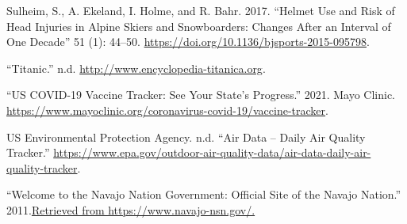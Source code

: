 \documentclass[
]{report}
\newlength{\cslhangindent}
\newlength{\cslentryspacingunit} %
\newenvironment{CSLReferences}[2] %
 {%
  \setlength{\parindent}{0pt}
  \ifodd #1
  \let\oldpar\par
  \def\par{\hangindent=\cslhangindent\oldpar}
  \fi
  \setlength{\parskip}{#2\cslentryspacingunit}
 }%
 {}
\begin{document}
\begin{CSLReferences}{1}{0}
\leavevmode{}%
Sulheim, S., A. Ekeland, I. Holme, and R. Bahr. 2017. {``Helmet Use and Risk of Head Injuries in Alpine Skiers and Snowboarders: Changes After an Interval of One Decade''} 51 (1): 44--50. \url{https://doi.org/10.1136/bjsports-2015-095798}.

\leavevmode{}%
{``Titanic.''} n.d. \url{http://www.encyclopedia-titanica.org}.

\leavevmode{}%
{``US COVID-19 Vaccine Tracker: See Your State's Progress.''} 2021. Mayo Clinic. \url{https://www.mayoclinic.org/coronavirus-covid-19/vaccine-tracker}.

\leavevmode{}%
US Environmental Protection Agency. n.d. {``Air Data -- Daily Air Quality Tracker.''} \url{https://www.epa.gov/outdoor-air-quality-data/air-data-daily-air-quality-tracker}.

\leavevmode{}%
{``Welcome to the Navajo Nation Government: Official Site of the Navajo Nation.''} 2011.\href{\%20Retrieved\%20from\%20https://www.navajo-nsn.gov/.}{Retrieved from https://www.navajo-nsn.gov/.}

\end{CSLReferences}
\end{document}
